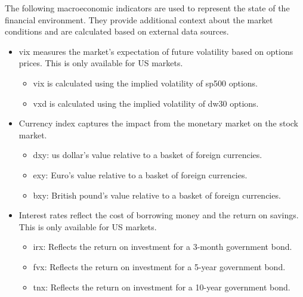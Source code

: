 The following macroeconomic indicators are used to represent the state of the financial environment. They provide additional context about the market conditions and are calculated based on external data sources.
\begin{itemize}
    \item \acrfull{vix} measures the market's expectation of future volatility based on options prices. This is only available for US markets.
    \begin{itemize}
        \item \acrshort{vix} is calculated using the implied volatility of \acrfull{sp500} options.
        \item \acrshort{vxd} is calculated using the implied volatility of \acrfull{dw30} options.
    \end{itemize}
    \item Currency index captures the impact from the monetary market on the stock market.
    \begin{itemize}
        \item \acrfull{dxy}: \acrfull{us} dollar's value relative to a basket of foreign currencies.
        \item \acrfull{exy}: Euro's value relative to a basket of foreign currencies.
        \item \acrfull{bxy}: British pound's value relative to a basket of foreign currencies.
    \end{itemize}
    \item Interest rates reflect the cost of borrowing money and the return on savings. This is only available for US markets.
    \begin{itemize}
        \item \acrfull{irx}: Reflects the return on investment for a 3-month government bond.
        \item \acrfull{fvx}: Reflects the return on investment for a 5-year government bond.
        \item \acrfull{tnx}: Reflects the return on investment for a 10-year government bond.
    \end{itemize}
\end{itemize}
